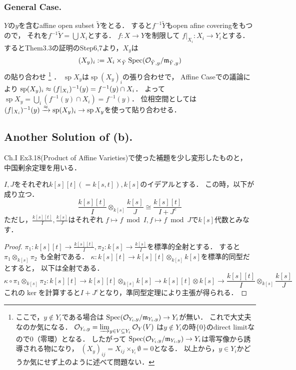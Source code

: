 \documentclass[a4paper]{jsarticle}
\newcommand{\shO}{\mathcal{O}}
\newcommand{\basesp}{\operatorname{sp}}
\begin{document}
    \subsubsection{General Case.}
    $Y$の$y$を含むaffine open subset $\tilde{Y}$をとる．
    すると$f^{-1}\tilde{Y}$もopen afine coveringをもつので，
    それを$f^{-1}\tilde{Y}=\bigcup X_{i}$とする．
    $f: X \to Y$を制限して
    $f|_{X_{i}}: X_{i} \to Y_i$とする．
    するとThem3.3の証明のStep6,7より，$X_y$は
    \[ (X_y)_{i}:=X_{i} \times_{\tilde{Y}} \Spec (\shO_{\tilde{Y},y}/\I{m}_{\tilde{Y},y}) \]
    の貼り合わせ
    \footnote
    {
    ここで，$y \not \in Y_i$である場合は
    $\Spec (\shO_{Y_i,y}/\I{m}_{Y_i,y}) \to Y_i$が無い．
    これで大丈夫なのか気になる．
    $\shO_{Y_i,y}=\varinjlim_{y \in V \subseteq Y_i} \shO_Y(V)$
    は$y \not \in Y_i$の時$\{0\}$のdirect limitなので$0$（零環）となる．
    したがって
    $\Spec (\shO_{Y_i,y}/\I{m}_{Y_i,y}) \to Y_i$は零写像から誘導される物になり，
    $(X_y)_{ij}=X_{ij} \times_{Y_i} \emptyset=0$となる．
    以上から，$y \in Y_i$かどうか気にせず上のように述べて問題ない．
    }
    ．
    $\basesp X_y$は$\basesp (X_y)_{i}$の張り合わせで，
    Affine Caseでの議論により
    $\basesp (X_y)_{i} \homeo (f|_{X_{i}})^{-1}(y)=f^{-1}(y) \cap X_{i}$．
    よって$\basesp X_y=\bigcup_{i} (f^{-1}(y) \cap X_{i})=f^{-1}(y)$．
    位相空間としては
    $(f|_{X_{i}})^{-1}(y) \homeomap \basesp (X_y)_{i} \to \basesp X_y$を使って貼り合わせる．

    \subsection{Another Solution of (b).}
    Ch.I Ex3.18(Product of Affine Varieties)で使った補題を少し変形したものと，
    中国剰余定理を用いる．

    \begin{Lemma}
        $I,J$をそれぞれ$k[s][t](=k[s,t]), k[s]$のイデアルとする．
        この時，以下が成り立つ．
        \[ \frac{k[s][t]}{I} \otimes_{k[s]} \frac{k[s]}{J} \cong \frac{k[s][t]}{I+J^e} \]
        ただし，$\frac{k[s][t]}{I}, \frac{k[s]}{J}$はそれぞれ
        $f \mapsto f \bmod I, f \mapsto f \bmod J$で$k[s]$代数とみなす．
    \end{Lemma}
    \begin{proof}
        $\pi_1: k[s][t] \to \frac{k[s][t]}{I}, \pi_2: k[s] \to \frac{k[s]}{I}$を標準的全射とする．
        すると$\pi_1 \otimes_{k[s]} \pi_2$
        も全射である．
        $\kappa: k[s][t] \to k[s][t] \otimes_{k[s]} k[s]$を標準的同型だとすると，
        以下は全射である．
        \[
            \kappa \circ \pi_1 \otimes_{k[s]} \pi_2:
                k[s][t] \to k[s][t] \otimes_{k[s]} k[s]
                \to k[s][t] \otimes k[s]
                \to \frac{k[s][t]}{I} \otimes_{k[s]} \frac{k[s]}{J}
        \]
        これの$\ker$を計算すると$I+J^e$となり，準同型定理により主張が得られる．
    \end{proof}
\end{document}

